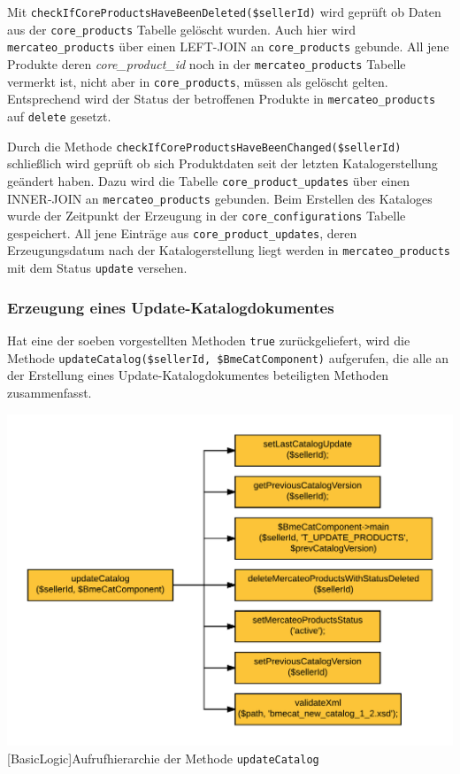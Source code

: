 	Mit \texttt{checkIfCoreProductsHaveBeenDeleted(\$sellerId)} wird geprüft ob Daten aus der \texttt{core\_products} Tabelle gelöscht wurden. Auch hier wird \texttt{mercateo\_products} über einen LEFT-JOIN an \texttt{core\_products} gebunde. All jene Produkte deren \textit{core\_product\_id} 
	noch in der \texttt{mercateo\_products} Tabelle vermerkt ist, nicht aber in \texttt{core\_products}, müssen als gelöscht gelten. Entsprechend wird der Status der betroffenen Produkte in \texttt{mercateo\_products} auf \texttt{delete} gesetzt.
	
	Durch die Methode \texttt{checkIfCoreProductsHaveBeenChanged(\$sellerId)} schließlich wird geprüft ob sich Produktdaten seit der letzten Katalogerstellung geändert haben. Dazu wird die Tabelle \texttt{core\_product\_updates} über einen INNER-JOIN an \texttt{mercateo\_products} gebunden.
	Beim Erstellen des Kataloges wurde der Zeitpunkt der Erzeugung in der \texttt{core\_configurations} Tabelle gespeichert. All jene Einträge aus \texttt{core\_product\_updates}, deren Erzeugungsdatum nach der Katalogerstellung liegt werden in \texttt{mercateo\_products} mit dem Status \texttt{update} versehen.
	
	\subsubsection{Erzeugung eines Update-Katalogdokumentes}
	
	Hat eine der soeben vorgestellten Methoden \texttt{true} zurückgeliefert, wird die Methode \texttt{updateCatalog(\$sellerId, \$BmeCatComponent)} aufgerufen, die alle an der Erstellung eines Update-Katalogdokumentes beteiligten Methoden zusammenfasst.
	
	\begin{minipage}{\linewidth}
		\vspace{1em}
		\centering
		\includegraphics[width=0.7 \linewidth]{img/updateKatalogAufrufhierarchie}
		[BasicLogic]{Aufrufhierarchie der Methode \texttt{updateCatalog}}
		\vspace{1em}
	\end{minipage}
	
